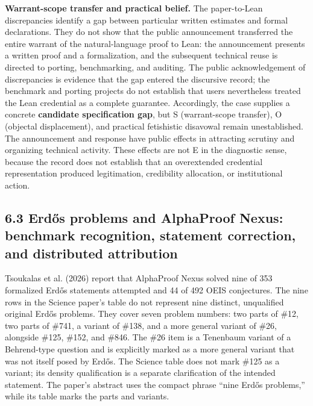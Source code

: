 \documentclass[sn-apa]{sn-jnl}
\begin{document}
\textbf{Warrant-scope transfer and practical belief.} The paper-to-Lean discrepancies identify a gap between particular written estimates and formal declarations. They do not show that the public announcement transferred the entire warrant of the natural-language proof to Lean: the announcement presents a written proof and a formalization, and the subsequent technical reuse is directed to porting, benchmarking, and auditing. The public acknowledgement of discrepancies is evidence that the gap entered the discursive record; the benchmark and porting projects do not establish that users nevertheless treated the Lean credential as a complete guarantee. Accordingly, the case supplies a concrete \textbf{candidate specification gap}, but S (warrant-scope transfer), O (objectal displacement), and practical fetishistic disavowal remain unestablished. The announcement and response have public effects in attracting scrutiny and organizing technical activity. These effects are not E in the diagnostic sense, because the record does not establish that an overextended credential representation produced legitimation, credibility allocation, or institutional action.

\subsection{6.3 Erdős problems and AlphaProof Nexus: benchmark recognition, statement correction, and distributed attribution}

Tsoukalas et al. (2026) report that AlphaProof Nexus solved nine of 353 formalized Erdős statements attempted and 44 of 492 OEIS conjectures. The nine rows in the Science paper’s table do not represent nine distinct, unqualified original Erdős problems. They cover seven problem numbers: two parts of \#12, two parts of \#741, a variant of \#138, and a more general variant of \#26, alongside \#125, \#152, and \#846. The \#26 item is a Tenenbaum variant of a Behrend-type question and is explicitly marked as a more general variant that was not itself posed by Erdős. The Science table does not mark \#125 as a variant; its density qualification is a separate clarification of the intended statement. The paper’s abstract uses the compact phrase “nine Erdős problems,” while its table marks the parts and variants.
\end{document}
